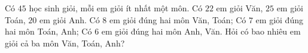 \begin{vd}%
	Có $45$ học sinh giỏi, mỗi em giỏi ít nhất một môn. Có $22$ em giỏi Văn, $25$ em giỏi Toán, $20$ em giỏi Anh. Có $8$ em giỏi đúng hai môn Văn, Toán; Có $7$ em giỏi đúng hai môn Toán, Anh; Có $6$ em giỏi đúng hai môn Anh, Văn. Hỏi có bao nhiêu em giỏi cả ba môn Văn, Toán, Anh?
\end{vd}
